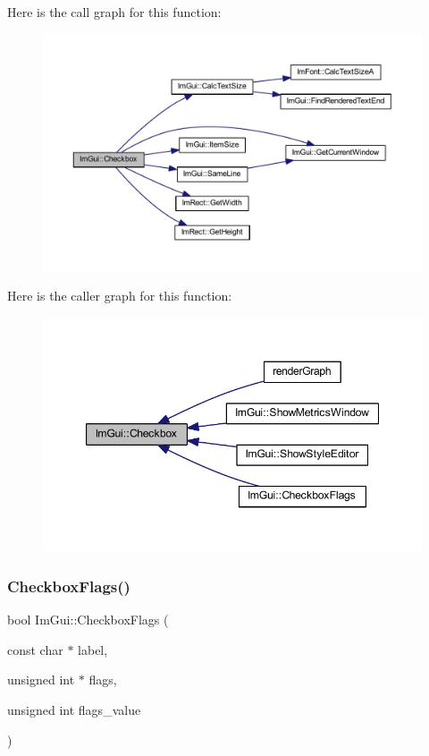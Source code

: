 Here is the call graph for this function\+:
\nopagebreak
\begin{figure}[H]
\begin{center}
\leavevmode
\includegraphics[width=350pt]{namespace_im_gui_a57d73c1d0ef807fef734d91024092027_cgraph}
\end{center}
\end{figure}
Here is the caller graph for this function\+:
\nopagebreak
\begin{figure}[H]
\begin{center}
\leavevmode
\includegraphics[width=347pt]{namespace_im_gui_a57d73c1d0ef807fef734d91024092027_icgraph}
\end{center}
\end{figure}
\mbox{\label{namespace_im_gui_aeca400dcf5a82c312b3e669d2fe6e88d}} 
\subsubsection{\texorpdfstring{Checkbox\+Flags()}{CheckboxFlags()}}
{\footnotesize\ttfamily bool Im\+Gui\+::\+Checkbox\+Flags (\begin{DoxyParamCaption}\item[{const char $\ast$}]{label,  }\item[{unsigned int $\ast$}]{flags,  }\item[{unsigned int}]{flags\+\_\+value }\end{DoxyParamCaption})}

